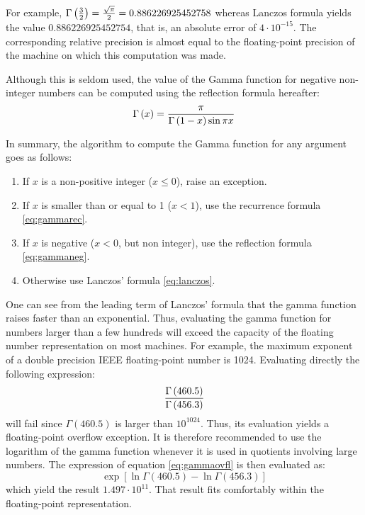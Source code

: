 For example, $\Gamma\left({3\over 2}\right)={\sqrt{\pi}\over 2}=
0.886226925452758$ whereas Lanczos formula yields the value
$0.886226925452754$, that is, an absolute error of $4\cdot
10^{-15} $. The corresponding relative precision is almost equal
to the floating-point precision of the machine on which this
computation was made.

Although this is seldom used, the value of the Gamma function for
negative non-integer numbers can be computed using the reflection
formula hereafter:
\begin{equation}
\label{eq:gammaneg} \Gamma\left(x\right)={\pi\over
\Gamma\left(1-x\right) \sin\pi x}
\end{equation}

In summary, the algorithm to compute the Gamma function for any
argument goes as follows:
\begin{enumerate}
  \item If $x$ is a non-positive integer ($x\le0$), raise an exception.
  \item If $x$ is smaller than or equal to 1 ($x<1$), use the recurrence formula \ref{eq:gammarec}.
  \item If $x$ is negative ($x<0$, but non integer), use the reflection
formula \ref{eq:gammaneg}.
  \item Otherwise use Lanczos' formula \ref{eq:lanczos}.
\end{enumerate}

One can see from the leading term of Lanczos' formula that the
gamma function raises faster than an exponential. Thus, evaluating
the gamma function for numbers larger than a few hundreds will
exceed the capacity of the floating number representation on most
machines. For example, the maximum exponent of a double precision
IEEE floating-point number is 1024. Evaluating directly the
following expression:
\begin{equation}
\label{eq:gammaovfl}
  {\Gamma\left(460.5\right)\over\Gamma\left(456.3\right)}
\end{equation}
will fail since $\Gamma\left(460.5\right)$ is larger than
$10^{1024}$. Thus, its evaluation yields a floating-point overflow
exception. It is therefore recommended to use the logarithm of the
gamma function whenever it is used in quotients involving large
numbers. The expression of equation \ref{eq:gammaovfl} is then
evaluated as:
\begin{equation}
  \exp\left[\ln\Gamma\left(460.5\right)-\ln\Gamma\left(456.3\right)\right]
\end{equation}
which yield the result $1.497\cdot 10^{11}$. That result fits
comfortably within the floating-point representation.

